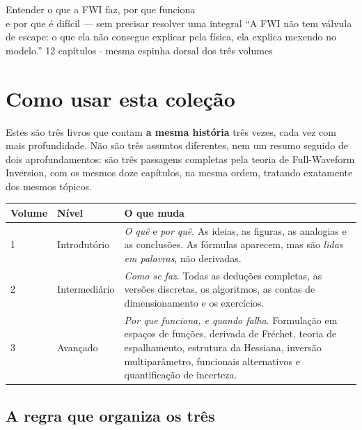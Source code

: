 \documentclass[11pt,a4paper,oneside]{report}
\begin{document}
\capafwi
{Entender o que a FWI faz, por que funciona\\e por que \'e dif\'icil ---
sem precisar resolver uma integral}
{``A FWI n\~ao tem v\'alvula de escape: o que ela n\~ao consegue explicar
pela f\'isica, ela explica mexendo no modelo.''}
{12 cap\'itulos $\cdot$ mesma espinha dorsal dos tr\^es volumes}

\tableofcontents
\cleardoublepage

\chapter*{Como usar esta cole\c{c}\~ao}

Estes s\~ao tr\^es livros que contam \textbf{a mesma hist\'oria} tr\^es vezes,
cada vez com mais profundidade. N\~ao s\~ao tr\^es assuntos diferentes, nem um
resumo seguido de dois aprofundamentos: s\~ao tr\^es passagens completas pela
teoria de Full-Waveform Inversion, com os mesmos doze cap\'itulos, na mesma
ordem, tratando exatamente dos mesmos t\'opicos.

\begin{center}
\begin{tabular}{@{}llp{7.6cm}@{}}
\toprule
\textbf{Volume} & \textbf{N\'ivel} & \textbf{O que muda} \\
\midrule
1 & Introdut\'orio & \emph{O qu\^e} e \emph{por qu\^e}. As ideias, as figuras,
as analogias e as conclus\~oes. As f\'ormulas aparecem, mas s\~ao
\emph{lidas em palavras}, n\~ao derivadas. \\
2 & Intermedi\'ario & \emph{Como se faz}. Todas as dedu\c{c}\~oes completas,
as vers\~oes discretas, os algoritmos, as contas de dimensionamento e os
exerc\'icios. \\
3 & Avan\c{c}ado & \emph{Por que funciona, e quando falha}. Formula\c{c}\~ao
em espa\c{c}os de fun\c{c}\~oes, derivada de Fr\'echet, teoria de
espalhamento, estrutura da Hessiana, invers\~ao multipar\^ametro, funcionais
alternativos e quantifica\c{c}\~ao de incerteza. \\
\bottomrule
\end{tabular}
\end{center}

\section*{A regra que organiza os tr\^es}
\end{document}
